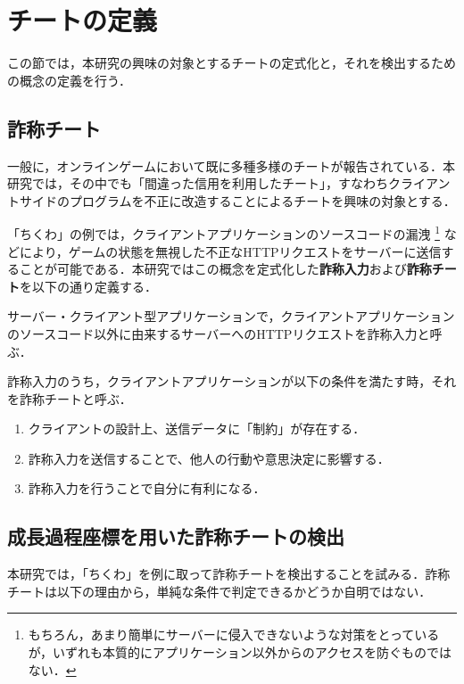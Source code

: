 \section{チートの定義}
この節では，本研究の興味の対象とするチートの定式化と，それを検出するための概念の定義を行う．

\subsection{詐称チート}
一般に，オンラインゲームにおいて既に多種多様のチートが報告されている\cite{cheatclass}．本研究では，その中でも「間違った信用を利用したチート」，すなわちクライアントサイドのプログラムを不正に改造することによるチートを興味の対象とする．

「ちくわ」の例では，クライアントアプリケーションのソースコードの漏洩
\footnote{もちろん，あまり簡単にサーバーに侵入できないような対策をとっているが，いずれも本質的にアプリケーション以外からのアクセスを防ぐものではない．}
などにより，ゲームの状態を無視した不正なHTTPリクエストをサーバーに送信することが可能である．本研究ではこの概念を定式化した{\bf 詐称入力}および{\bf 詐称チート}を以下の通り定義する．

\begin{mathdef}[詐称入力]
サーバー・クライアント型アプリケーションで，クライアントアプリケーションのソースコード以外に由来するサーバーへのHTTPリクエストを詐称入力と呼ぶ．
\end{mathdef}

\begin{mathdef}[詐称チート]
詐称入力のうち，クライアントアプリケーションが以下の条件を満たす時，それを詐称チートと呼ぶ．

\begin{enumerate}
\item
クライアントの設計上、送信データに「制約」が存在する．
\item
詐称入力を送信することで、他人の行動や意思決定に影響する．
\item
詐称入力を行うことで自分に有利になる．
\end{enumerate}

\end{mathdef}

\subsection{成長過程座標を用いた詐称チートの検出}
本研究では，「ちくわ」を例に取って詐称チートを検出することを試みる．詐称チートは以下の理由から，単純な条件で判定できるかどうか自明ではない．


